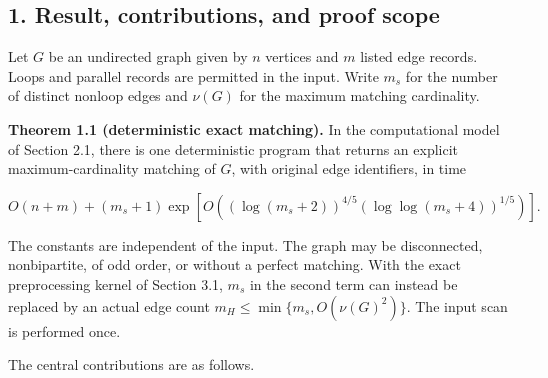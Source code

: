 \hypertarget{af-46593eb93e-result-contributions-and-proof-scope}{%
\subsection{1. Result, contributions, and proof scope}\label{af-46593eb93e-result-contributions-and-proof-scope}}

Let \(G\) be an undirected graph given by \(n\) vertices and \(m\) listed edge records. Loops and parallel records are permitted in the input. Write \(m_s\) for the number of distinct nonloop edges and \(\nu(G)\) for the maximum matching cardinality.

\textbf{Theorem 1.1 (deterministic exact matching).} In the computational model of Section 2.1, there is one deterministic program that returns an explicit maximum-cardinality matching of \(G\), with original edge identifiers, in time

\[
O(n+m)+(m_s+1)
 \exp\!\left[O\!\left(
   (\log(m_s+2))^{4/5}
   (\log\log(m_s+4))^{1/5}
 \right)\right].
 \tag{1}
\]

The constants are independent of the input. The graph may be disconnected, nonbipartite, of odd order, or without a perfect matching. With the exact preprocessing kernel of Section 3.1, \(m_s\) in the second term can instead be replaced by an actual edge count \(m_H\leq\min\{m_s,O(\nu(G)^2)\}\). The input scan is performed once.

The central contributions are as follows.

